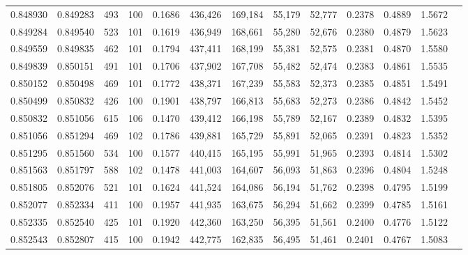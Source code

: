 \begin{tabular}{rrrrrrrrrrrrr}
0.848930 & 0.849283 &   493 & 100 &                                     0.1686 & 436,426 & 169,184 &  55,179 &  52,777 & 0.2378 & 0.4889 & 1.5672 \\
0.849284 & 0.849540 &   523 & 101 &                                     0.1619 & 436,949 & 168,661 &  55,280 &  52,676 & 0.2380 & 0.4879 & 1.5623 \\
0.849559 & 0.849835 &   462 & 101 &                                     0.1794 & 437,411 & 168,199 &  55,381 &  52,575 & 0.2381 & 0.4870 & 1.5580 \\
0.849839 & 0.850151 &   491 & 101 &                                     0.1706 & 437,902 & 167,708 &  55,482 &  52,474 & 0.2383 & 0.4861 & 1.5535 \\
0.850152 & 0.850498 &   469 & 101 &                                     0.1772 & 438,371 & 167,239 &  55,583 &  52,373 & 0.2385 & 0.4851 & 1.5491 \\
0.850499 & 0.850832 &   426 & 100 &                                     0.1901 & 438,797 & 166,813 &  55,683 &  52,273 & 0.2386 & 0.4842 & 1.5452 \\
0.850832 & 0.851056 &   615 & 106 &                                     0.1470 & 439,412 & 166,198 &  55,789 &  52,167 & 0.2389 & 0.4832 & 1.5395 \\
0.851056 & 0.851294 &   469 & 102 &                                     0.1786 & 439,881 & 165,729 &  55,891 &  52,065 & 0.2391 & 0.4823 & 1.5352 \\
0.851295 & 0.851560 &   534 & 100 &                                     0.1577 & 440,415 & 165,195 &  55,991 &  51,965 & 0.2393 & 0.4814 & 1.5302 \\
0.851563 & 0.851797 &   588 & 102 &                                     0.1478 & 441,003 & 164,607 &  56,093 &  51,863 & 0.2396 & 0.4804 & 1.5248 \\
0.851805 & 0.852076 &   521 & 101 &                                     0.1624 & 441,524 & 164,086 &  56,194 &  51,762 & 0.2398 & 0.4795 & 1.5199 \\
0.852077 & 0.852334 &   411 & 100 &                                     0.1957 & 441,935 & 163,675 &  56,294 &  51,662 & 0.2399 & 0.4785 & 1.5161 \\
0.852335 & 0.852540 &   425 & 101 &                                     0.1920 & 442,360 & 163,250 &  56,395 &  51,561 & 0.2400 & 0.4776 & 1.5122 \\
0.852543 & 0.852807 &   415 & 100 &                                     0.1942 & 442,775 & 162,835 &  56,495 &  51,461 & 0.2401 & 0.4767 & 1.5083 \\

\end{tabular}
